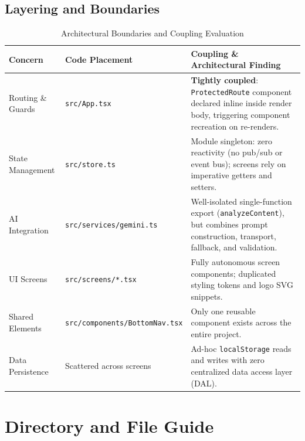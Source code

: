 \documentclass[10pt,a4paper]{report}
\begin{document}
\section{Layering and Boundaries}

\begin{table}[htbp]
\centering
\small
\caption{Architectural Boundaries and Coupling Evaluation}
\begin{tabularx}{\textwidth}{l p{3.5cm} X}
\toprule
\textbf{Concern} & \textbf{Code Placement} & \textbf{Coupling \& Architectural Finding} \\
\midrule
Routing \& Guards & \texttt{src/App.tsx} & \textbf{Tightly coupled}: \texttt{ProtectedRoute} component declared inline inside render body, triggering component recreation on re-renders. \\
State Management & \texttt{src/store.ts} & Module singleton: zero reactivity (no pub/sub or event bus); screens rely on imperative getters and setters. \\
AI Integration & \texttt{src/services/gemini.ts} & Well-isolated single-function export (\texttt{analyzeContent}), but combines prompt construction, transport, fallback, and validation. \\
UI Screens & \texttt{src/screens/*.tsx} & Fully autonomous screen components; duplicated styling tokens and logo SVG snippets. \\
Shared Elements & \texttt{src/components/BottomNav.tsx} & Only one reusable component exists across the entire project. \\
Data Persistence & Scattered across screens & Ad-hoc \texttt{localStorage} reads and writes with zero centralized data access layer (DAL). \\
\bottomrule
\end{tabularx}
\end{table}

\chapter{Directory and File Guide}
\end{document}
